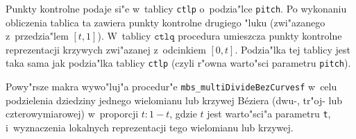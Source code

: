 Punkty kontrolne podaje si"e w~tablicy \texttt{ctlp} o~podzia"lce
\texttt{pitch}. Po wykonaniu obliczenia tablica ta zawiera punkty kontrolne
drugiego "luku (zwi"azanego z~przedzia"lem $[t,1]$).
W~tablicy $\texttt{ctlq}$ procedura umieszcza punkty kontrolne reprezentacji
krzywych zwi"azanej z~odcinkiem $[0,t]$. Podzia"lka tej tablicy jest taka
sama jak podzia"lka tablicy \texttt{ctlp} (czyli r"owna warto"sci parametru
\texttt{pitch}).


\vspace{\bigskipamount}
\begin{sloppypar}
Powy"rsze makra wywo"luj"a procedur"e
\texttt{mbs\_multiDivideBezCurvesf} w~celu podzielenia dziedziny jednego
wielomianu lub krzywej B\'{e}ziera (dwu-, tr"oj- lub czterowymiarowej)
w~proporcji $t:1-t$, gdzie $t$ jest warto"sci"a parametru \texttt{t},
i~wyznaczenia lokalnych reprezentacji tego wielomianu lub krzywej.
\end{sloppypar}

